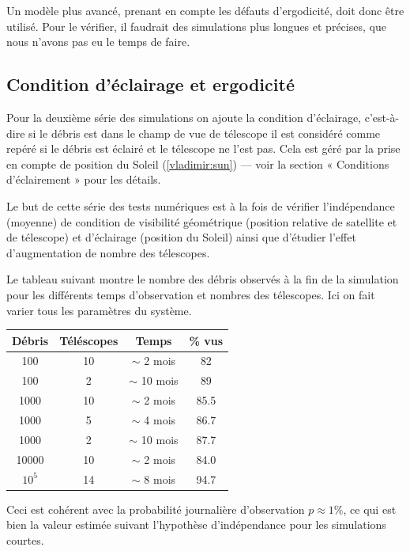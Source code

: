 Un modèle plus avancé, prenant en compte les défauts d'ergodicité,
doit donc être utilisé. Pour le vérifier, il faudrait des simulations
plus longues et précises, que nous n'avons pas eu le temps de faire.  
\subsection{Condition d'\'eclairage et ergodicit\'e}  
Pour la deuxi\`eme s\'erie des simulations on ajoute la condition d'\'eclairage, c'est-\`a-dire 
si le d\'ebris est dans le champ de vue de t\'elescope il est consid\'er\'e comme rep\'er\'e
si le d\'ebris est \'eclair\'e et le t\'elescope ne l'est pas. Cela est g\'er\'e par la prise 
en compte de position du Soleil (\autoref{vladimir:sun}) --- voir la section 
« Conditions d'\'eclairement » pour les d\'etails. 

Le but de cette s\'erie des tests num\'eriques est \`a la fois de v\'erifier 
l'ind\'ependance (moyenne) de condition de visibilit\'e g\'eom\'etrique (position
relative de satellite et de t\'elescope) et d'\'eclairage (position
du Soleil) ainsi que d'\'etudier l'effet d'augmentation de nombre des
t\'elescopes. 

Le tableau suivant montre le nombre des d\'ebris observ\'es
\`a la fin de la simulation pour les diff\'erents temps d'observation et nombres des
t\'elescopes. Ici on fait varier tous les param\`etres du syst\`eme.

\begin{center}
\begin{tabular}{|c|c|c|c|} \hline
 D\'ebris & T\'el\'escopes & Temps & \% vus \\ 
 \hline \hline
 100 & 10 & $\sim$ 2 mois &82 \\
 \hline
 100 & 2 & $\sim$ 10 mois &89 \\
 \hline
 \hline
 1000 & 10 & $\sim$ 2 mois &85.5 \\
 \hline
 1000 & 5 & $\sim$ 4 mois &86.7 \\
 \hline
 1000 & 2 & $\sim$ 10 mois &87.7 \\
 \hline  
 \hline
 10000 & 10 & $\sim$ 2 mois &84.0 \\
 \hline
 \hline
 $10^5$ & 14 & $\sim$ 8 mois &  94.7 \\
 \hline
\end{tabular} 
\end{center}
Ceci est coh\'erent avec la probabilit\'e journali\`ere d'observation 
   $p \approx 1\%$, ce qui est bien la valeur estim\'ee suivant l'hypoth\`ese 
   d'ind\'ependance pour les simulations courtes. 
   
